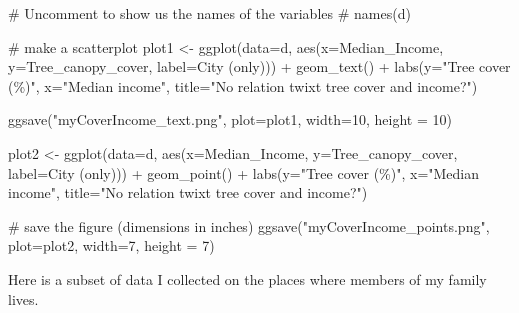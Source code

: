 \documentclass[
  letterpaper,
  DIV=11,
  numbers=noendperiod]{scrreprt}
\newenvironment{Shaded}{\begin{snugshade}}{\end{snugshade}}
\newcommand{\AttributeTok}[1]{\textcolor[rgb]{0.40,0.45,0.13}{#1}}
\newcommand{\CommentTok}[1]{\textcolor[rgb]{0.37,0.37,0.37}{#1}}
\newcommand{\DecValTok}[1]{\textcolor[rgb]{0.68,0.00,0.00}{#1}}
\newcommand{\FunctionTok}[1]{\textcolor[rgb]{0.28,0.35,0.67}{#1}}
\newcommand{\NormalTok}[1]{\textcolor[rgb]{0.00,0.23,0.31}{#1}}
\newcommand{\OtherTok}[1]{\textcolor[rgb]{0.00,0.23,0.31}{#1}}
\newcommand{\SpecialCharTok}[1]{\textcolor[rgb]{0.37,0.37,0.37}{#1}}
\newcommand{\StringTok}[1]{\textcolor[rgb]{0.13,0.47,0.30}{#1}}
\begin{document}
\begin{Shaded}
\begin{Highlighting}[]
\CommentTok{\# Uncomment to show us the names of the variables}
\CommentTok{\# names(d)}

\CommentTok{\# make a scatterplot}
\NormalTok{plot1 }\OtherTok{\textless{}{-}} \FunctionTok{ggplot}\NormalTok{(}\AttributeTok{data=}\NormalTok{d, }\FunctionTok{aes}\NormalTok{(}\AttributeTok{x=}\NormalTok{Median\_Income, }
                   \AttributeTok{y=}\NormalTok{Tree\_canopy\_cover, }
                   \AttributeTok{label=}\StringTok{\textasciigrave{}}\AttributeTok{City (only)}\StringTok{\textasciigrave{}}\NormalTok{)) }\SpecialCharTok{+} \FunctionTok{geom\_text}\NormalTok{() }\SpecialCharTok{+}
  \FunctionTok{labs}\NormalTok{(}\AttributeTok{y=}\StringTok{"Tree cover (\%)"}\NormalTok{, }\AttributeTok{x=}\StringTok{"Median income"}\NormalTok{, }\AttributeTok{title=}\StringTok{"No relation twixt tree cover and income?"}\NormalTok{)}

\FunctionTok{ggsave}\NormalTok{(}\StringTok{"myCoverIncome\_text.png"}\NormalTok{, }\AttributeTok{plot=}\NormalTok{plot1, }\AttributeTok{width=}\DecValTok{10}\NormalTok{, }\AttributeTok{height =} \DecValTok{10}\NormalTok{)}

\NormalTok{plot2 }\OtherTok{\textless{}{-}} \FunctionTok{ggplot}\NormalTok{(}\AttributeTok{data=}\NormalTok{d, }\FunctionTok{aes}\NormalTok{(}\AttributeTok{x=}\NormalTok{Median\_Income, }
                   \AttributeTok{y=}\NormalTok{Tree\_canopy\_cover, }
                   \AttributeTok{label=}\StringTok{\textasciigrave{}}\AttributeTok{City (only)}\StringTok{\textasciigrave{}}\NormalTok{)) }\SpecialCharTok{+} 
  \FunctionTok{geom\_point}\NormalTok{() }\SpecialCharTok{+}
  \FunctionTok{labs}\NormalTok{(}\AttributeTok{y=}\StringTok{"Tree cover (\%)"}\NormalTok{, }\AttributeTok{x=}\StringTok{"Median income"}\NormalTok{, }\AttributeTok{title=}\StringTok{"No relation twixt tree cover and income?"}\NormalTok{)}

\CommentTok{\# save the figure (dimensions in inches)}
\FunctionTok{ggsave}\NormalTok{(}\StringTok{"myCoverIncome\_points.png"}\NormalTok{, }\AttributeTok{plot=}\NormalTok{plot2, }\AttributeTok{width=}\DecValTok{7}\NormalTok{, }\AttributeTok{height =} \DecValTok{7}\NormalTok{)}
\end{Highlighting}
\end{Shaded}

Here is a subset of data I collected on the places where members of my
family lives.
\end{document}
